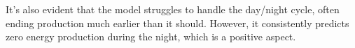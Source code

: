 It's also evident that the model struggles to handle the
day/night cycle, often ending production much earlier than it should.
However, it consistently predicts zero energy production
during the night, which is a positive aspect.







